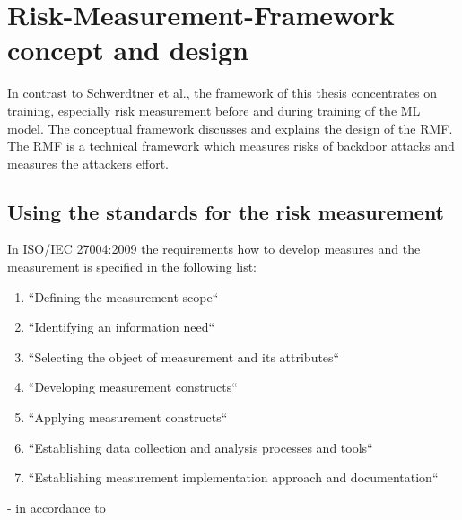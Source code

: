 \section{Risk-Measurement-Framework concept and design}
\label{sec:conFrame}

In contrast to Schwerdtner et al., the framework of this thesis concentrates on training, especially risk measurement before and during training of the ML model.
The conceptual framework discusses and explains the design of the RMF. The RMF is a technical framework which measures risks of backdoor attacks and measures the attackers effort.

\subsection{Using the standards for the risk measurement}

In ISO/IEC 27004:2009 the requirements how to develop measures and the measurement is specified in the following list:

\begin{enumerate}[label=(\alph*)]
  \item \label{itm:a} ``Defining the measurement scope``
  \item \label{itm:b} ``Identifying an information need``
  \item \label{itm:c} ``Selecting the object of measurement and its attributes``
  \item \label{itm:d} ``Developing measurement constructs``
  \item \label{itm:e} ``Applying measurement constructs``
  \item \label{itm:f} ``Establishing data collection and analysis processes and tools``
  \item \label{itm:g} ``Establishing measurement implementation approach and documentation``
\end{enumerate}

\hfill - in accordance to \cite{ISO_27004_2009} \\

